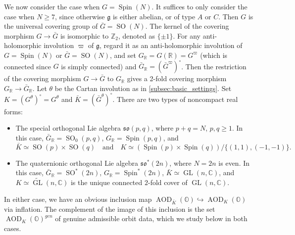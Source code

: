 \documentclass[11pt, a4paper]{amsart}
\newcommand{\C}{\mathbb{C}}
\newcommand{\orb}{\mathbb{O}}
\newcommand{\Z}{\mathbb{Z}}
\newcommand{\fg}{\mathfrak{g}}
\newcommand{\fso}{\mathfrak{so}}
\DeclareMathOperator{\AOD}{AOD}
\newcommand{\AODK}{\AOD_K}
\newcommand{\SO}{\operatorname{SO}}
\newcommand{\Spin}{\operatorname{Spin}}
\newcommand{\R}{\mathbb{R}}
\newcommand{\GR}{G_\R}
\newcommand{\GL}{\operatorname{GL}}
\theoremstyle{definition}
\numberwithin{equation}{section}
\begin{document}
We now consider the case when $G=\Spin(N)$. It suffices to only consider the case when $N \geqslant 7$, since otherwise $\fg$ is either abelian, or of type $A$ or $C$. Then $G$ is the universal covering group of $\bar{G} = \SO(N)$. The kernel of the covering morphism $G \to \bar{G}$ is isomorphic to $\Z_2$, denoted as $\{\pm 1\}$. For any anti-holomorphic involution $\varpi$ of $\fg$, regard it as an anti-holomorphic involution of $G=\Spin(N)$ or $\bar{G} = \SO(N)$, and set $\GR = G(\R) = G^\varpi$ (which is connected since $G$ is simply connected) and $\bar{G}_\R = (\bar{G}^\varpi)^\circ$. Then the restriction of the covering morphism $G \to \bar{G}$ to $\GR$ gives a 2-fold covering morphism $\GR \to \bar{G}_\R$. Let $\theta$ be the Cartan involution as in \cref{subsec:basic_settings}. Set $K = (G^\theta)^\circ = G^\theta$ and $\bar{K} = (\bar{G}^\theta)^\circ$.
There are two types of noncompact real forms: 
\begin{itemize}[itemindent=*, leftmargin=*]
	\item The special orthogonal Lie algebra $\fso(p,q)$, where $p+q=N$, $p,q \geqslant 1$. In this case, $\bar{G}_\R=\SO_0(p,q)$, $\GR=\Spin(p,q)$, and
		\[ \bar{K} \simeq \SO(p) \times \SO(q) \quad \text{and} \quad K \simeq (\Spin(p) \times \Spin(q))/\{(1, 1), (-1, -1)\}. \]
	\item The quaternionic orthogonal Lie algebra $\fso^*(2n)$, where $N=2n$ is even. In this case, $\bar{G}_\R=\SO^*(2n)$, $\GR=\Spin^*(2n)$, $\bar{K} \simeq \GL(n,\C)$, and $K \simeq \widetilde{\GL}(n, \C)$ is the unique connected $2$-fold cover of $\GL(n,\C)$.
\end{itemize}
In either case, we have an obvious inclusion map $\AOD_{\bar{K}}(\orb) \hookrightarrow \AODK(\orb)$ via inflation. The complement of the image of this inclusion is the set $\AODK(\orb)^{gen}$ of genuine admissible orbit data, which we study below in both cases.
\end{document}
